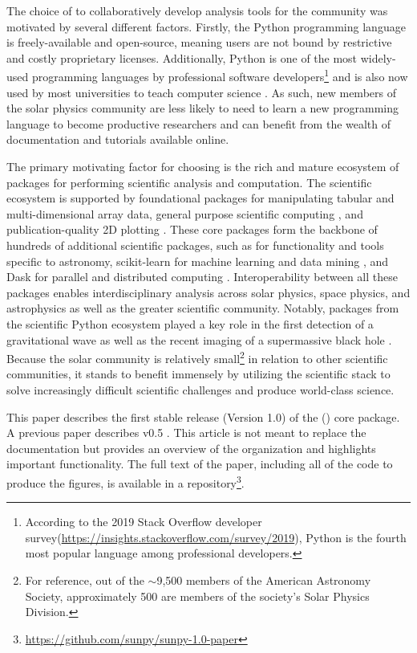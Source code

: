 The choice of \python to collaboratively develop analysis tools for the community was motivated by several different factors.
Firstly, the Python programming language is freely-available and open-source, meaning users are not bound by restrictive and costly proprietary licenses.
Additionally, Python is one of the most widely-used programming languages by professional software developers\footnote{According to the 2019 Stack Overflow developer survey(\url{https://insights.stackoverflow.com/survey/2019}), Python is the fourth most popular language among professional developers.} and is also now used by most universities to teach computer science \citep{guo2014}.
As such, new members of the solar physics community are less likely to need to learn a new programming language to become productive researchers and can benefit from the wealth of \python documentation and tutorials available online.

The primary motivating factor for choosing \python is the rich and mature ecosystem of packages for performing scientific analysis and computation. 
The scientific \python ecosystem is supported by foundational packages for manipulating tabular \citep[\pandas,][]{pandas} and multi-dimensional array\citep[\numpy,][]{numpy} data, general purpose scientific computing \citep[\scipy,][]{scipy}, and publication-quality 2D plotting \citep[\matplotlib,][]{matplotlib}. 
These core packages form the backbone of hundreds of additional scientific \python packages, such as \astropypkg for functionality and tools specific to astronomy, scikit-learn for machine learning and data mining \citep{pedregosa11}, and Dask for parallel and distributed computing \citep{rocklin15}. Interoperability between all these packages enables interdisciplinary analysis across solar physics, space physics, and astrophysics as well as the greater scientific community.
Notably, packages from the scientific Python ecosystem played a key role in the first detection of a gravitational wave \citep{ligo_scientific_collaboration_and_virgo_collaboration_observation_2016} as well as the recent imaging of a supermassive black hole \citep{collaboration_first_2019}.
Because the solar community is relatively small\footnote{For reference, out of the $\sim$9,500 members of the American Astronomy Society, approximately 500 are members of the society's Solar Physics Division.} in relation to other scientific communities, it stands to benefit immensely by utilizing the \python scientific stack to solve increasingly difficult scientific challenges and produce world-class science.

This paper describes the first stable release (Version 1.0) of the (\sunpypkg) core package.
A previous paper describes v0.5 \citep{Community:2015cy}.
This article is not meant to replace the \sunpypkg documentation but provides an overview of the organization and highlights important functionality.
The full text of the paper, including all of the code to produce the figures, is available in a \github repository\footnote{\url{https://github.com/sunpy/sunpy-1.0-paper}}.